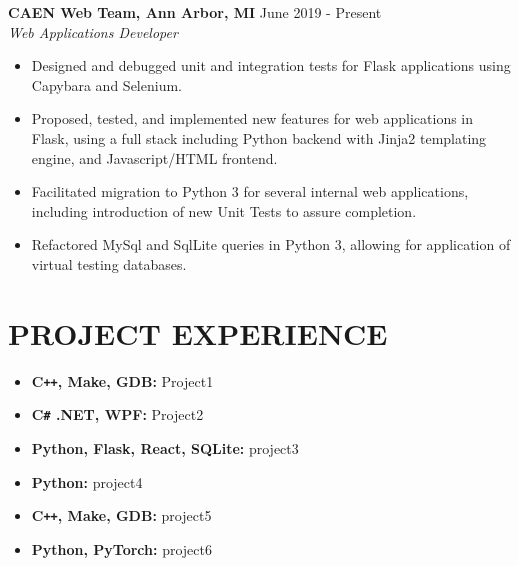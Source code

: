 \documentclass[overlapped]{res}
\begin{document}
\begin{resume}
    \textbf{CAEN Web Team, Ann Arbor, MI}
    \hfill June 2019 - Present \\
    {\sl Web Applications Developer}
    \begin{itemize}  \itemsep -2pt %
        \item Designed and debugged unit and integration tests for Flask applications using Capybara and Selenium.
        \item Proposed, tested, and implemented new features for web applications in Flask, using a full stack including Python backend with Jinja2 templating engine, and Javascript/HTML frontend.
        \item Facilitated migration to Python 3 for several internal web applications, including introduction of new Unit Tests to assure completion.
        \item Refactored MySql and SqlLite queries in Python 3, allowing for application of virtual testing databases.

    \end{itemize}

    \section{PROJECT EXPERIENCE}

    \begin{itemize}[label={}]  \itemsep -2pt %
        \item \textbf{C\texttt{++}, Make, GDB:}
              Project1
        \item \textbf{C\texttt{\#} .NET, WPF:}
              Project2
        \item \textbf{Python, Flask, React, SQLite:}
              project3
        \item \textbf{Python:}
              project4
        \item \textbf{C\texttt{++}, Make, GDB:}
              project5
        \item \textbf{Python, PyTorch:}
              project6
    \end{itemize}


\end{resume}
\end{document}

